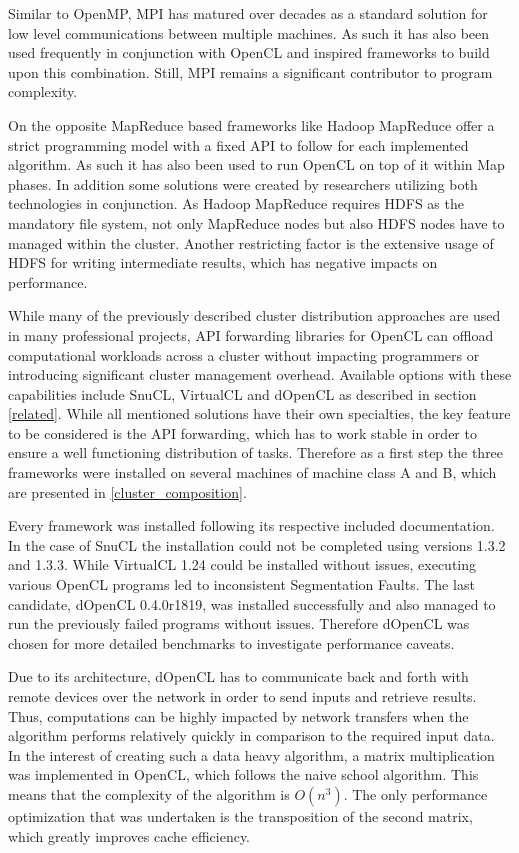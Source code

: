 Similar to OpenMP, MPI has matured over decades as a standard solution for low level communications between multiple machines. As such it has also been used frequently in conjunction with OpenCL and inspired frameworks to build upon this combination. Still, MPI remains a significant contributor to program complexity.

On the opposite MapReduce based frameworks like Hadoop MapReduce offer a strict programming model with a fixed API to follow for each implemented algorithm. As such it has also been used to run OpenCL on top of it within Map phases. In addition some solutions were created by researchers utilizing both technologies in conjunction. As Hadoop MapReduce requires HDFS as the mandatory file system, not only MapReduce nodes but also HDFS nodes have to managed within the cluster. Another restricting factor is the extensive usage of HDFS for writing intermediate results, which has negative impacts on performance.

While many of the previously described cluster distribution approaches are used in many professional projects, API forwarding libraries for OpenCL can offload computational workloads across a cluster without impacting programmers or introducing significant cluster management overhead. Available options with these capabilities include SnuCL, VirtualCL and dOpenCL as described in section \ref{related}. While all mentioned solutions have their own specialties, the key feature to be considered is the API forwarding, which has to work stable in order to ensure a well functioning distribution of tasks. Therefore as a first step the three frameworks were installed on several machines of machine class A and B, which are presented in \ref{cluster_composition}.

Every framework was installed following its respective included documentation. In the case of SnuCL the installation could not be completed using versions 1.3.2 and 1.3.3. While VirtualCL 1.24 could be installed without issues, executing various OpenCL programs led to inconsistent Segmentation Faults. The last candidate, dOpenCL 0.4.0r1819, was installed successfully and also managed to run the previously failed programs without issues. Therefore dOpenCL was chosen for more detailed benchmarks to investigate performance caveats.

Due to its architecture, dOpenCL has to communicate back and forth with remote devices over the network in order to send inputs and retrieve results. Thus, computations can be highly impacted by network transfers when the algorithm performs relatively quickly in comparison to the required input data. In the interest of creating such a data heavy algorithm, a matrix multiplication was implemented in OpenCL, which follows the naive school algorithm. This means that the complexity of the algorithm is $O(n^3)$. The only performance optimization that was undertaken is the transposition of the second matrix, which greatly improves cache efficiency.

